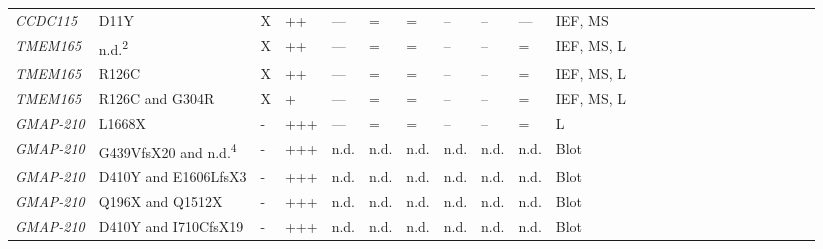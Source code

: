 \begin{landscape}
\begin{longtable}[c]{C{1.2cm}C{2cm}C{0.5cm}C{1.5cm}C{1.5cm}C{0.5cm}C{0.5cm}C{0.5cm}C{0.5cm}C{1.5cm}C{1.5cm}C{1.5cm}c c c c c c c c c c c c}
        \emph{CCDC115} & D11Y & X                       & ++                                      & ---                                 & =   & =      & --   & --  & ---                                  & IEF, MS                       & \cite{jansen_ccdc115_2016} \\
        \emph{TMEM165} & n.d.\textsuperscript{2} & X                       & ++                                      & ---                                 & =   & =      & --   & --  & =                                  & IEF, MS, L                       & \cite{foulquier_tmem165_2012} \\
        \emph{TMEM165} & R126C & X                       & ++                                      & ---                                 & =   & =      & --   & --  & =                                  & IEF, MS, L                       & \cite{foulquier_tmem165_2012} \\
        \emph{TMEM165} & R126C and G304R & X                       & +                                      & ---                                 & =   & =      & --   & --  & =                                  & IEF, MS, L                       & \cite{foulquier_tmem165_2012} \\
        \emph{GMAP-210} & L1668X & -                       & +++                                      & ---                                 & =   & =      & --   & --  & =                                  & L                       & \cite{smits_lethal_2010} \\
        \emph{GMAP-210} & G439VfsX20 and n.d.\textsuperscript{4} & -                       & +++                                      & n.d.                                 & n.d.   & n.d. & n.d.   & n.d.  & n.d.                                  & Blot                       & \cite{wehrle_hypomorphic_2019} \\
        \emph{GMAP-210} & D410Y and E1606LfsX3 & -                       & +++                                      & n.d.                                 & n.d.   & n.d. & n.d.   & n.d.  & n.d.                                  & Blot                       & \cite{wehrle_hypomorphic_2019} \\
        \emph{GMAP-210} & Q196X and Q1512X & -                       & +++                                      & n.d.                                 & n.d.   & n.d. & n.d.   & n.d.  & n.d.                                  & Blot                       & \cite{wehrle_hypomorphic_2019} \\
        \emph{GMAP-210} & D410Y and I710CfsX19 & -                       & +++                                      & n.d.                                 & n.d.   & n.d. & n.d.   & n.d.  & n.d.                                  & Blot                       & \cite{wehrle_hypomorphic_2019} \\

\end{longtable}
\end{landscape}
